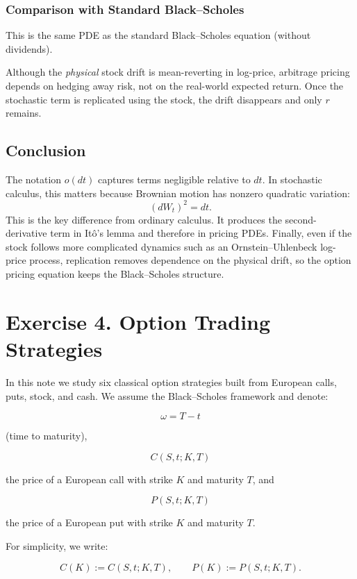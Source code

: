 \documentclass[11pt]{article}
\begin{document}
\subsubsection*{Comparison with Standard Black--Scholes}

This is the same PDE as the standard Black--Scholes equation (without dividends).

Although the \emph{physical} stock drift is mean-reverting in log-price, arbitrage pricing depends on hedging away risk, not on the real-world expected return. Once the stochastic term is replicated using the stock, the drift disappears and only $r$ remains.


\subsection*{Conclusion}

The notation $o(dt)$ captures terms negligible relative to $dt$. In stochastic calculus, this matters because Brownian motion has nonzero quadratic variation:
\[
(dW_t)^2=dt.
\]
This is the key difference from ordinary calculus. It produces the second-derivative term in It\^o's lemma and therefore in pricing PDEs. Finally, even if the stock follows more complicated dynamics such as an Ornstein--Uhlenbeck log-price process, replication removes dependence on the physical drift, so the option pricing equation keeps the Black--Scholes structure.

\newpage
\section*{Exercise 4. Option Trading Strategies}

In this note we study six classical option strategies built from European calls, puts, stock, and cash.  
We assume the Black--Scholes framework and denote:

\[
\omega=T-t
\]

(time to maturity),

\[
C(S,t;K,T)
\]

the price of a European call with strike $K$ and maturity $T$, and

\[
P(S,t;K,T)
\]

the price of a European put with strike $K$ and maturity $T$.

For simplicity, we write:

\[
C(K):=C(S,t;K,T), \qquad P(K):=P(S,t;K,T).
\]
\end{document}

